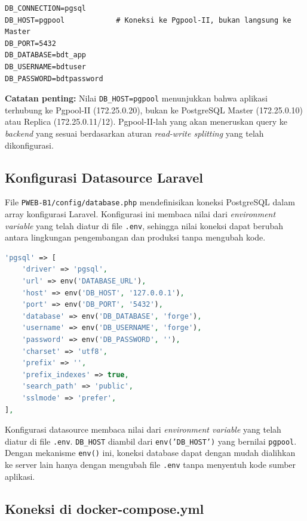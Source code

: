 \begin{lstlisting}[caption={Konfigurasi Environment Aplikasi
(PWEB-B1/.env)}, label={lst:env}]
DB_CONNECTION=pgsql
DB_HOST=pgpool            # Koneksi ke Pgpool-II, bukan langsung ke Master
DB_PORT=5432
DB_DATABASE=bdt_app
DB_USERNAME=bdtuser
DB_PASSWORD=bdtpassword
\end{lstlisting}

\textbf{Catatan penting:} Nilai \texttt{DB\_HOST=pgpool} menunjukkan
bahwa aplikasi terhubung ke Pgpool-II (172.25.0.20), bukan ke
PostgreSQL Master (172.25.0.10) atau Replica (172.25.0.11/12).
Pgpool-II-lah yang akan meneruskan query ke \textit{backend} yang
sesuai berdasarkan aturan \textit{read-write splitting} yang telah
dikonfigurasi.

\subsection{Konfigurasi Datasource Laravel}

File \texttt{PWEB-B1/config/database.php} mendefinisikan koneksi
PostgreSQL dalam array konfigurasi Laravel. Konfigurasi ini membaca
nilai dari \textit{environment variable} yang telah diatur di file
\texttt{.env}, sehingga nilai koneksi dapat berubah antara lingkungan
pengembangan dan produksi tanpa mengubah kode.

\begin{lstlisting}[language=PHP, caption={Konfigurasi Datasource
Laravel (PWEB-B1/config/database.php)}, label={lst:datasource}]
'pgsql' => [
    'driver' => 'pgsql',
    'url' => env('DATABASE_URL'),
    'host' => env('DB_HOST', '127.0.0.1'),
    'port' => env('DB_PORT', '5432'),
    'database' => env('DB_DATABASE', 'forge'),
    'username' => env('DB_USERNAME', 'forge'),
    'password' => env('DB_PASSWORD', ''),
    'charset' => 'utf8',
    'prefix' => '',
    'prefix_indexes' => true,
    'search_path' => 'public',
    'sslmode' => 'prefer',
],
\end{lstlisting}

Konfigurasi datasource membaca nilai dari \textit{environment
variable} yang telah diatur di file \texttt{.env}.
\texttt{DB\_HOST} diambil dari \texttt{env('DB\_HOST')} yang bernilai
\texttt{pgpool}. Dengan mekanisme \texttt{env()} ini, koneksi database
dapat dengan mudah dialihkan ke server lain hanya dengan mengubah file
\texttt{.env} tanpa menyentuh kode sumber aplikasi.

\subsection{Koneksi di docker-compose.yml}

